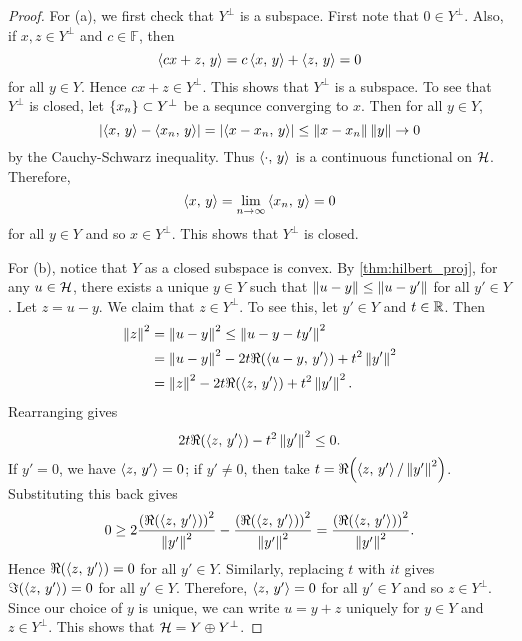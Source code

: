 \begin{proof}
    For (a), we first check that $Y^\perp$ is a subspace. First note that 
    $0\in Y^\perp$. Also, if $x,z\in Y^\perp$ and $c\in\mathbb{F}$, then 
    \begin{equation*}
        \left\langle {cx+z},\, {y} \right\rangle = c\left\langle {x},\, {y} \right\rangle + \left\langle {z},\, {y} \right\rangle = 0
    \end{equation*}
    for all $y\in Y$. Hence $cx+z\in Y^\perp$. This shows that $Y^\perp$ is a 
    subspace. To see that $Y^\perp$ is closed, let $\left\{ {x_n} \right\}\subset Y^\perp$ 
    be a sequnce converging to $x$. Then for all $y\in Y$, 
    \begin{equation*}
        \left\lvert {\left\langle {x},\, {y} \right\rangle - \left\langle {x_n},\, {y} \right\rangle} \right\rvert = \left\lvert {\left\langle {x-x_n},\, {y} \right\rangle} \right\rvert 
        \leq \left\lVert {x-x_n} \right\rVert\left\lVert {y} \right\rVert \to 0
    \end{equation*}
    by the Cauchy-Schwarz inequality. Thus $\left\langle {\cdot},\, {y} \right\rangle$ is a continuous 
    functional on $\mathcal{H}$. Therefore,
    \begin{equation*}
        \left\langle {x},\, {y} \right\rangle = \lim_{n\to\infty}\left\langle {x_n},\, {y} \right\rangle = 0
    \end{equation*}
    for all $y\in Y$ and so $x\in Y^\perp$. This shows that $Y^\perp$ is closed. 

    For (b), notice that $Y$ as a closed subspace is convex. By 
    \cref{thm:hilbert_proj}, for any $u\in\mathcal{H}$, there exists a unique 
    $y\in Y$ such that $\left\lVert {u-y} \right\rVert\leq \left\lVert {u-y'} \right\rVert$ for all $y'\in Y$. 
    Let $z = u-y$. We claim that $z\in Y^\perp$. To see this, let $y'\in Y$ 
    and $t\in\mathbb{R}$. Then 
    \begin{equation*}
        \begin{split}
            \norm{z}^2 &= \norm{u-y}^2 \leq \norm{u-y-ty'}^2 \\
            &= \norm{u-y}^2 - 2t\Re\pth{\inp{u-y}{y'}} + t^2\norm{y'}^2 \\
            &= \norm{z}^2 - 2t\Re\pth{\inp{z}{y'}} + t^2\norm{y'}^2.
        \end{split}
    \end{equation*} 
    Rearranging gives
    \begin{equation*}
        2t\Re\pth{\inp{z}{y'}} - t^2\norm{y'}^2 \leq 0.
    \end{equation*}
    If $y' = 0$, we have $\left\langle {z},\, {y'} \right\rangle = 0$; if $y'\neq 0$, then take 
    $t = \Re\pth{\inp{z}{y'}/\norm{y'}^2}$. Substituting this back gives
    \begin{equation*}
        0 \geq 2\frac{\pth{\Re\pth{\inp{z}{y'}}}^2}{\norm{y'}^2} 
        - \frac{\pth{\Re\pth{\inp{z}{y'}}}^2}{\norm{y'}^2}
        = \frac{\pth{\Re\pth{\inp{z}{y'}}}^2}{\norm{y'}^2}.
    \end{equation*}
    Hence $\Re\pth{\inp{z}{y'}} = 0$ for all $y'\in Y$. Similarly, replacing 
    $t$ with $it$ gives $\Im\pth{\inp{z}{y'}} = 0$ for all $y'\in Y$. 
    Therefore, $\left\langle {z},\, {y'} \right\rangle = 0$ for all $y'\in Y$ and so $z\in Y^\perp$. 
    Since our choice of $y$ is unique, we can write $u = y + z$ uniquely for 
    $y\in Y$ and $z\in Y^\perp$. This shows that $\mathcal{H} = Y\oplus Y^\perp$. 


\end{proof}
